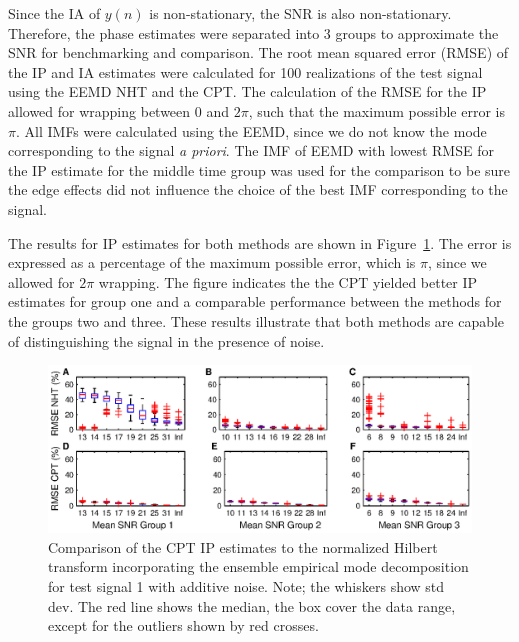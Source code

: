 \documentclass[a4paper]{IEEEtran}
\begin{document}
Since the IA of $y(n)$ is non-stationary, the SNR is also non-stationary. Therefore, the phase estimates were separated into $3$ groups to approximate the SNR for benchmarking and comparison. The root mean squared error (RMSE) of the IP and IA estimates were calculated for 100 realizations of the test signal using the EEMD NHT and the CPT. The calculation of the RMSE for the IP allowed for wrapping between $0$ and $2\pi$, such that the maximum possible error is $\pi$. All IMFs were calculated using the EEMD, since we do not know the mode corresponding to the signal \emph{a priori}. The IMF of EEMD with lowest RMSE for the IP estimate for the middle time group was used for the comparison to be sure the edge effects did not influence the choice of the best IMF corresponding to the signal. 

The results for IP estimates for both methods are shown in Figure~\ref{fig:RMSEComparison}. The error is expressed as a percentage of the maximum possible error, which is $\pi$, since we allowed for $2\pi$ wrapping. The figure indicates the the CPT yielded better IP estimates for group one and a comparable performance between the methods for the groups two and three. These results illustrate that both methods are capable of distinguishing the signal in the presence of noise. 
\begin{figure}[!ht]\label{fig:RMSEComparison}
    \centering
        \includegraphics[scale=1]{./Figures/SNRcomparisonFigure.eps}
    \caption{Comparison of the CPT IP estimates to the normalized Hilbert transform incorporating the ensemble empirical mode decomposition for test signal 1 with additive noise. Note; the whiskers show std dev. The red line shows the median, the box cover the data range, except for the outliers shown by red crosses.}
\end{figure}
\end{document}
